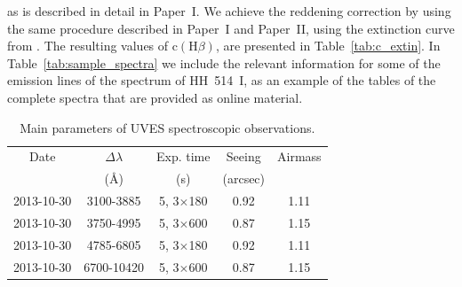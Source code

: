 \documentclass[fleqn,usenatbib]{mnras}
\begin{document}
\citep{Tody93} as is described in detail in Paper~I. We achieve the reddening correction by using the same procedure described in Paper~I and Paper~II, using the extinction curve from \citet{Blagrave07}. The resulting values of $\text{c}(\text{H}\beta)$, are presented in Table~\ref{tab:c_extin}. In Table~\ref{tab:sample_spectra} we include the relevant information for some of the emission lines of the spectrum of HH~514~I, as an example of the tables of the complete spectra that are provided as online material.

\begin{table}
\caption{Main parameters of UVES spectroscopic observations.}
\label{tab:obs_set}
\begin{tabular}{ccccc}
\hline
Date & $\Delta \lambda$& Exp. time  &Seeing &Airmass\\
 & (\AA) &  (s) & (arcsec)&\\
\hline
2013-10-30 & 3100-3885 & 5, 3$\times$180 &0.92&1.11\\
2013-10-30 & 3750-4995 & 5, 3$\times$600 & 0.87 & 1.15\\
2013-10-30 & 4785-6805 & 5, 3$\times$180 &0.92&1.11\\
2013-10-30 & 6700-10420 & 5, 3$\times$600 & 0.87 & 1.15\\
\hline
\end{tabular}
\end{table}
\end{document}

